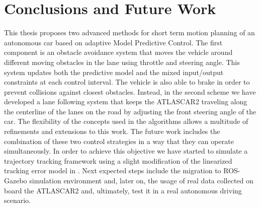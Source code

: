 \chapter{Conclusions and Future Work}
This thesis proposes two advanced methods for short term motion planning of an autonomous car based on adaptive Model Predictive Control. The first component is an obstacle avoidance system that moves the vehicle around different moving obstacles in the lane using throttle and steering angle. This system updates both the predictive model and the mixed input/output constraints at each control interval. The vehicle is also able to brake in order to prevent collisions against closest obstacles. Instead, in the second scheme  we have developed a lane following system that keeps the ATLASCAR2 traveling along the centerline of the lanes on the road by adjusting the front steering angle of the car.  The flexibility of the concepts used in the algorithms allows a multitude of refinements and extensions to this work. The future work includes the combination of these two control strategies in a way that they can operate simultaneously. In order to achieve this objective we have started to simulate a trajectory tracking framework using a slight modification of the linearized tracking error model in \cite{error_model}. Next expected steps include the migration to ROS-Gazebo simulation environment and, later on, the usage of real data collected on board the ATLASCAR2 and, ultimately, test it in a real autonomous driving scenario.
